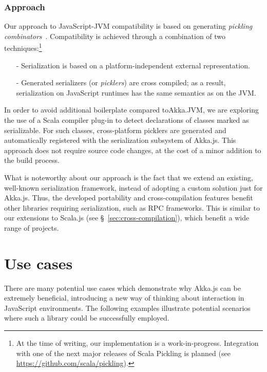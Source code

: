 \documentclass{sig-alternate}
\begin{document}
\subsubsection{Approach}

Our approach to JavaScript-JVM compatibility is based on generating {\em pickling
combinators}~\cite{MillerHBO13}. Compatibility is achieved through a combination of two
techniques:\footnote{At the time of writing, our implementation is a work-in-progress.
Integration with one of the next major releases of Scala Pickling is planned (see
\url{https://github.com/scala/pickling}).}
\begin{itemize}
\item[-] Serialization is based on a platform-independent external representation.
\item[-] Generated serializers (or {\em picklers}) are cross compiled; as a result,
         serialization on JavaScript runtimes has the same semantics as on the JVM.
\end{itemize}

In order to avoid additional boilerplate compared to\newline Akka.JVM, we are exploring
the use of a Scala compiler plug-in to detect declarations of classes
marked as serializable. For such classes, cross-platform picklers are generated
and automatically registered with the serialization subsystem of Akka.js.
This approach does not require source code changes, at the cost of a minor addition
to the build process.

What is noteworthy about our approach is the fact that we extend an existing,
well-known serialization framework, instead of adopting a custom solution just
for Akka.js. Thus, the developed portability and cross-compilation features benefit other
libraries requiring serialization, such as RPC frameworks. This is similar to
our extensions to Scala.js (see \S~\ref{sec:cross-compilation}), which benefit
a wide range of projects.


\section{Use cases}\label{sec:usecases}

There are many potential use cases which demonstrate why Akka.js can be extremely beneficial, introducing a new way of thinking about interaction in JavaScript environments. The following examples illustrate potential scenarios where such a library could be successfully employed.
\end{document}
